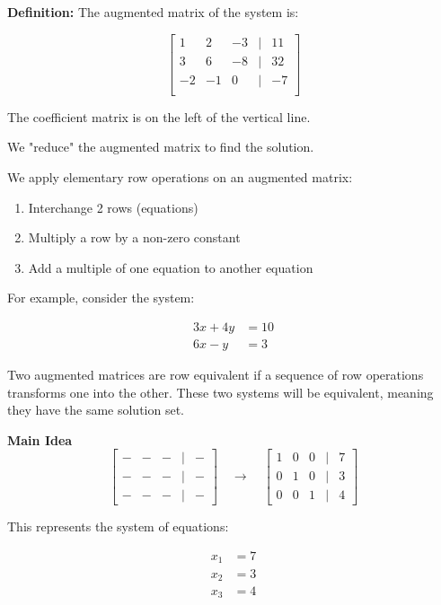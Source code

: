 \documentclass{article}
\begin{document}
\textbf{Definition:} The augmented matrix of the system is:

\[
\begin{bmatrix}
    1 & 2 & -3 & | & 11 \\
    3 & 6 & -8 & | & 32 \\
    -2 & -1 & 0 & | & -7 \\
\end{bmatrix}
\]

The coefficient matrix is on the left of the vertical line.

We "reduce" the augmented matrix to find the solution.

We apply elementary row operations on an augmented matrix:

\begin{enumerate}
    \item Interchange 2 rows (equations)
    \item Multiply a row by a non-zero constant
    \item Add a multiple of one equation to another equation
\end{enumerate}

For example, consider the system:


\begin{align*}
    3x + 4y &= 10 \\
    6x - y &= 3
\end{align*}


Two augmented matrices are row equivalent if a sequence of row operations transforms one into the other. These two systems will be equivalent, meaning they have the same solution set.

\textbf{Main Idea}
\[
\begin{bmatrix}
    - & - & - & | & - \\
    - & - & - & | & - \\
    - & - & - & | & -
\end{bmatrix}
\quad \rightarrow \quad
\begin{bmatrix}
    1 & 0 & 0 & | & 7 \\
    0 & 1 & 0 & | & 3 \\
    0 & 0 & 1 & | & 4
\end{bmatrix}
\]

This represents the system of equations:

\begin{align*}
    x_1 &= 7 \\
    x_2 &= 3 \\
    x_3 &= 4
\end{align*}
\end{document}
